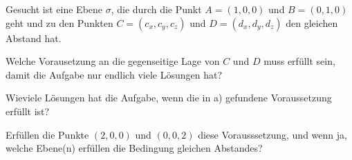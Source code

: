 Gesucht ist eine Ebene $\sigma$, die durch die Punkt $A=(1,0,0)$
und $B=(0,1,0)$ geht 
und zu den Punkten $C=(c_x,c_y,c_z)$ und $D=(d_x,d_y,d_z)$
den gleichen Abstand hat.
\begin{teilaufgaben}
\item Welche Vorausetzung an die gegenseitige Lage von $C$ und $D$
muss erfüllt sein, damit die Aufgabe nur endlich viele Lösungen hat?
\item Wieviele Lösungen hat die Aufgabe, wenn die in a) gefundene
Voraussetzung erfüllt ist?
\item Erfüllen die Punkte $(2,0,0)$ und $(0,0,2)$ diese Vorausssetzung,
und wenn ja, welche Ebene(n) erfüllen die Bedingung gleichen Abstandes?
\end{teilaufgaben}


